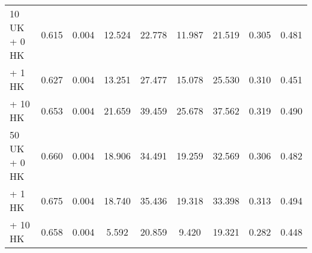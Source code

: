 \begin{table*}[!ht]
\begin{tabular}{l|cc|cccccc}
\hspace{1.5ex} 10 UK\hspace{1.2ex} + \hspace{3.5ex} 0 HK       & 0.615                                 & 0.004                                & 12.524                            & 22.778                               & 11.987                               & 21.519                              & 0.305                              & 0.481                              \\
\hspace{9.3ex} + \hspace{3.5ex} 1 HK      & 0.627                                 & 0.004                                & 13.251                            & 27.477                               & 15.078                               & 25.530                               & 0.310                                & 0.451                                \\
 \hspace{9.3ex} + \hspace{2.5ex} 10 HK     & 0.653                                 & 0.004                                & 21.659                            & 39.459                               & 25.678                               & 37.562                               & 0.319                                & 0.490                                \\
\hspace{1.5ex} 50 UK\hspace{1.2ex} + \hspace{3.5ex} 0 HK     & 0.660                              & 0.004                                & 18.906                           & 34.491                            & 19.259                               & 32.569                               & 0.306                               & 0.482                                \\
\hspace{9.3ex} + \hspace{2.5ex} 1 HK     & 0.675                                 & 0.004                                & 18.740                            & 35.436                               & 19.318                               & 33.398                               & 0.313                                & 0.494                                \\
 \hspace{9.3ex} + \hspace{2.5ex} 10 HK   & 0.658                                 & 0.004                                & 5.592                             & 20.859                               & 9.420                                & 19.321                               & 0.282                                & 0.448                                \\

\end{tabular}
\end{table*}
